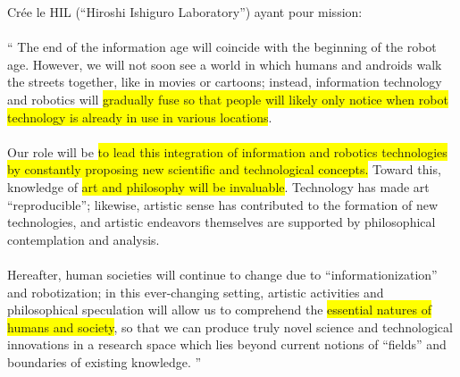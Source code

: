 \documentclass{beamer}
\begin{document}
\begin{frame}
  Crée le HIL (``Hiroshi Ishiguro Laboratory'') ayant pour mission:\\~\\
  ``{
    \footnotesize  
    The end of the information age will coincide with the beginning of the 
    robot age. However, we will not soon see a world in which humans and 
    androids walk the streets together, like in movies or cartoons; instead, 
    information technology and robotics will \colorbox{yellow}{gradually 
      fuse so that people will likely only notice when robot technology is already in use in 
      various locations}.\\
    ~\\

    Our role will be \colorbox{yellow}{to lead this integration of information and robotics 
      technologies by constantly proposing new scientific and technological 
      concepts.}
    Toward this, knowledge of \colorbox{yellow}{art and philosophy will be invaluable}.
    Technology has made art ``reproducible''; likewise, artistic sense has 
    contributed to the formation of new technologies, and artistic endeavors
    themselves are supported by philosophical contemplation and analysis.\\
    ~\\
    
    Hereafter, human societies will continue to change due to ``informationization'' 
    and robotization; in this ever-changing setting, artistic activities and philosophical 
    speculation will allow us to comprehend the \colorbox{yellow}{essential natures of humans and society}, 
    so that we can produce truly novel science and technological innovations in a 
    research space which lies beyond current notions of ``fields'' and boundaries of existing knowledge.
  }''

\end{frame}
\end{document}
